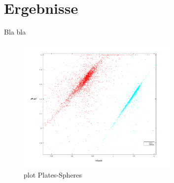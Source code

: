 \section{Ergebnisse}
Bla bla

\begin{figure}[!h]
    \centering
    \includegraphics[width=0.7\textwidth]{pics/plotPlates-Spheres.png}
    \caption{plot Plates-Spheres}
    \label{fig:plotPlates-Spheres}
\end{figure}
